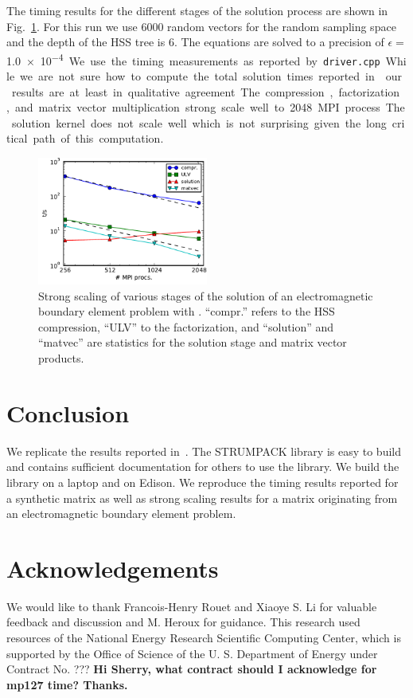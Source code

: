 \documentclass{acmsmall}
\newcommand{\dmcomment}[1]{\textbf{#1}}
\begin{document}
The timing results for the different stages of the solution
process are shown in Fig.~\ref{fig:strongscaling}.  For this run
we use 6000 random vectors for the random sampling space and the
depth of the HSS tree is 6.  The equations are solved to a
precision of $\epsilon=$\SI{1.0e-4}.  We use the
timing measurements as reported by \verb~driver.cpp~.
While we are not sure how to compute the total solution times
reported in~\cite{rouet:strumpack} our results are at least in
qualitative agreement.  The compression, factorization, and
matrix vector multiplication strong scale well to 2048 MPI process.
The solution kernel does not scale well which is not surprising
given the long critical path of this computation.
\begin{figure}
  \begin{center}
  \includegraphics[width=0.5\textwidth]{strong_scaling}
  \end{center}
  \caption{Strong scaling of various stages of the solution of an
  electromagnetic boundary element problem with \strumpack{}.
  ``compr.'' refers to the HSS compression, ``ULV'' to the
  factorization,  and ``solution'' and ``matvec'' are statistics
  for the solution stage and matrix vector products.}
  \label{fig:strongscaling}
\end{figure}


\section{Conclusion}

We replicate the results reported in~\cite{rouet:strumpack}.  The
STRUMPACK library is easy to build and contains sufficient
documentation for others to use the library.  We build the
library on a laptop and on Edison.  We reproduce the timing
results reported for a synthetic matrix as well as strong scaling
results for a matrix originating from an electromagnetic boundary
element problem.


\section{Acknowledgements}

We would like to thank Francois-Henry Rouet and Xiaoye S. Li for
valuable feedback and discussion and M. Heroux for guidance.
This research used resources of the National Energy Research
Scientific Computing Center, which is supported by the Office of
Science of the U. S. Department of Energy under Contract No. ???
\dmcomment{Hi Sherry, what contract should I acknowledge for
  mp127 time? Thanks.}



\end{document}
